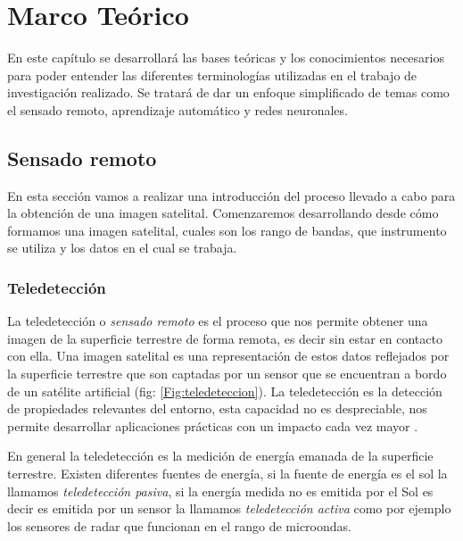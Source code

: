\chapter{Marco Teórico} \label{chap:marcoteorico}

En este capítulo se desarrollará las bases teóricas y los conocimientos necesarios para poder entender las diferentes terminologías utilizadas en el trabajo de investigación realizado. Se tratará de dar un enfoque simplificado de temas como el sensado remoto,  aprendizaje automático y redes neuronales.

\section{Sensado remoto}\label{sec:sensadoremoto}

En esta sección vamos a realizar una introducción del proceso llevado a cabo para la obtención de una imagen satelital. Comenzaremos desarrollando desde cómo formamos una imagen satelital, cuales son los rango de bandas, que instrumento se utiliza y los datos en el cual se trabaja.

\subsection{Teledetección}\label{sub:teledeteccion}

La teledetección o \textit{sensado remoto} es el proceso que nos permite obtener una imagen de la superficie terrestre de forma remota, es decir sin estar en contacto con ella. Una imagen satelital es una representación de estos datos reflejados por la superficie terrestre que son captadas por un sensor que se encuentran a bordo de un satélite artificial (fig: \ref{Fig:teledeteccion}). La teledetección es la detección de propiedades relevantes del entorno, esta capacidad no es despreciable, nos permite desarrollar aplicaciones prácticas con un impacto cada vez mayor \citep{percepcion}.

En general la teledetección es la medición de energía emanada de la superficie terrestre. Existen diferentes fuentes de energía, si la fuente de energía es el sol la llamamos \textit{teledetección pasiva}, si la energía medida no es emitida por el Sol es decir es emitida por un sensor la llamamos \textit{teledetección activa} como por ejemplo los sensores de radar que funcionan en el rango de microondas.

